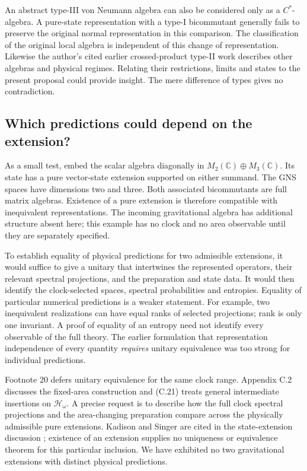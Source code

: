 \documentclass[11pt]{article}
\begin{document}
An abstract type-III von Neumann algebra can also be considered only as a $C^*$-algebra. A pure-state representation with a type-I bicommutant generally fails to preserve the original normal representation in this comparison. The classification of the original local algebra is independent of this change of representation. Likewise the author's cited earlier crossed-product type-II work describes other algebras and physical regimes. Relating their restrictions, limits and states to the present proposal could provide insight. The mere difference of types gives no contradiction.

\subsection{Which predictions could depend on the extension?}
As a small test, embed the scalar algebra diagonally in $M_2(\mathbb C)\oplus M_3(\mathbb C)$. Its state has a pure vector-state extension supported on either summand. The GNS spaces have dimensions two and three. Both associated bicommutants are full matrix algebras. Existence of a pure extension is therefore compatible with inequivalent representations. The incoming gravitational algebra has additional structure absent here; this example has no clock and no area observable until they are separately specified.

To establish equality of physical predictions for two admissible extensions, it would suffice to give a unitary that intertwines the represented operators, their relevant spectral projections, and the preparation and state data. It would then identify the clock-selected spaces, spectral probabilities and entropies. Equality of particular numerical predictions is a weaker statement. For example, two inequivalent realizations can have equal ranks of selected projections; rank is only one invariant. A proof of equality of an entropy need not identify every observable of the full theory. The earlier formulation that representation independence of every quantity \emph{requires} unitary equivalence was too strong for individual predictions.

Footnote 20 defers unitary equivalence for the same clock range. Appendix C.2 discusses the fixed-area construction and (C.21) treats general intermediate insertions on $\mathcal H_\omega$. A precise request is to describe how the full clock spectral projections and the area-changing preparation compare across the physically admissible pure extensions. Kadison and Singer are cited in the state-extension discussion \cite{ks}; existence of an extension supplies no uniqueness or equivalence theorem for this particular inclusion. We have exhibited no two gravitational extensions with distinct physical predictions.
\end{document}
